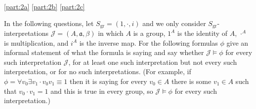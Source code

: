 \documentclass[boxes,pages,color=CornflowerBlue]{homework}
\begin{document}
\begin{solution}
    \ref{part:2a}
    \ref{part:2b}
    \ref{part:2c}
\end{solution}

\begin{problem}
In the following questions, let $S_\text{gr} = (1, \cdot, i)$ and we only consider $S_\text{gr}$-interpretations $\mathcal{J} = (A, \mathfrak{a}, \beta)$ in which $A$ is a group, $1^A$ is the identity of $A$, $\cdot^A$ is multiplication, and $i^A$ is the inverse map.
For the following formulas $\phi$ give an informal statement of what the formula is saying and say whether $\mathcal{J} \vDash \phi$ for every such interpretation $\mathcal{J}$, for at least one such interpretation but not every such interpretation, or for no such interpretations.
(For example, if $\phi = \forall v_0 \exists v_1 \cdot v_0 v_1\equiv 1$ then it is saying for every $v_0\in A$ there is some $v_1\in A$ such that $v_0\cdot v_1 = 1$ and this is true in every group, so $\mathcal{J}\vDash \phi$ for every such interpretation.)
\end{problem}
\end{document}
